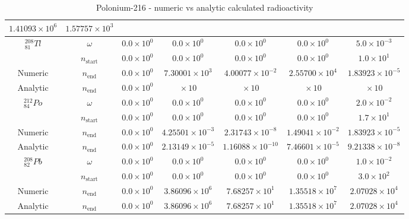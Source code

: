 \begin{table}[h]
\begin{center}
\begin{longtable}{c c c c c c c}
${1.41093} \times 10^{6}$ & ${1.57757} \times 10^{3}$ \\
\hline
${}^{208}_{81}Tl$ & $\omega$ & 
${0.0} \times 10^{0}$ & ${0.0} \times 10^{0}$ & ${0.0} \times 10^{0}$ &
${0.0} \times 10^{0}$ & ${5.0} \times 10^{-3}$ \\
 & $n_{\text{start}}$ & 
${0.0} \times 10^{0}$ & ${0.0} \times 10^{0}$ & ${0.0} \times 10^{0}$ &
${0.0} \times 10^{0}$ & ${1.0} \times 10^{1}$ \\
Numeric & $n_{\text{end}}$ & 
${0.0} \times 10^{0}$ & ${7.30001} \times 10^{3}$ & ${4.00077} \times 10^{-2}$ & 
${2.55700} \times 10^{4}$ & ${1.83923} \times 10^{-5}$ \\
Analytic & $n_{\text{end}}$ & 
${0.0} \times 10^{0}$ & ${} \times 10^{}$ & ${} \times 10^{}$ & 
${} \times 10^{}$ & ${} \times 10^{}$ \\
\hline
${}^{212}_{84}Po$ & $\omega$ & 
${0.0} \times 10^{0}$ & ${0.0} \times 10^{0}$ & ${0.0} \times 10^{0}$ &
${0.0} \times 10^{0}$ & ${2.0} \times 10^{-2}$ \\
 & $n_{\text{start}}$ & 
${0.0} \times 10^{0}$ & ${0.0} \times 10^{0}$ & ${0.0} \times 10^{0}$ &
${0.0} \times 10^{0}$ & ${1.7} \times 10^{1}$ \\
Numeric & $n_{\text{end}}$ & 
${0.0} \times 10^{0}$ & ${4.25501} \times 10^{-3}$ & ${2.31743} \times 10^{-8}$ & 
${1.49041} \times 10^{-2}$ & ${1.83923} \times 10^{-5}$ \\
Analytic & $n_{\text{end}}$ & 
${0.0} \times 10^{0}$ & ${2.13149} \times 10^{-5}$ & ${1.16088} \times 10^{-10}$ & 
${7.46601} \times 10^{-5}$ & ${9.21338} \times 10^{-8}$ \\
\hline
${}^{208}_{82}Pb$ & $\omega$ & 
${0.0} \times 10^{0}$ & ${0.0} \times 10^{0}$ & ${0.0} \times 10^{0}$ &
${0.0} \times 10^{0}$ & ${1.0} \times 10^{-2}$ \\
 & $n_{\text{start}}$ & 
${0.0} \times 10^{0}$ & ${0.0} \times 10^{0}$ & ${0.0} \times 10^{0}$ &
${0.0} \times 10^{0}$ & ${3.0} \times 10^{2}$ \\
Numeric & $n_{\text{end}}$ & 
${0.0} \times 10^{0}$ & ${3.86096} \times 10^{6}$ & ${7.68257} \times 10^{1}$ & 
${1.35518} \times 10^{7}$ & ${2.07028} \times 10^{4}$ \\
Analytic & $n_{\text{end}}$ & 
${0.0} \times 10^{0}$ & ${3.86096} \times 10^{6}$ & ${7.68257} \times 10^{1}$ & 
${1.35518} \times 10^{7}$ & ${2.07028} \times 10^{4}$ \\
\hline\hline
\end{longtable}
\end{center}
\caption{Polonium-216 - numeric vs analytic calculated radioactivity}
\label{table:po216trialdata}
\end{table}








